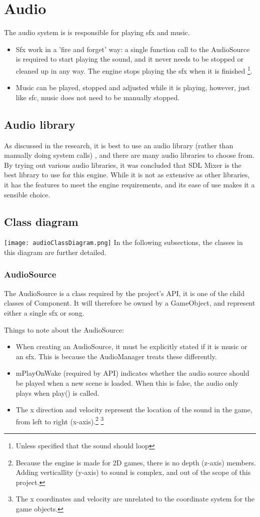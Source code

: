 \section{Audio}
\label{sec:audio}
The audio system is is responsible for playing sfx and music.
\begin{itemize}
    \item Sfx work in a 'fire and forget' way: a single function call to the AudioSource is required to start playing the sound, and it never needs to be stopped or cleaned up in any way. The engine stops playing the sfx when it is finished \footnote{Unless specified that the sound should loop}.
    \item Music can be played, stopped and adjusted while it is playing, however, just like sfc, music does not need to be manually stopped.
\end{itemize}

\subsection{Audio library}
As discussed in the research, it is best to use an audio library (rather than manually doing system calls)
, and there are many audio libraries to choose from. By trying out various audio libraries, it was concluded that
SDL Mixer is the best library to use for this engine. While it is not as extensive as other libraries,
it has the features to meet the engine requirements, and its ease of use makes it a sensible choice.

\subsection{Class diagram}
\texttt{[image: audioClassDiagram.png]}
In the following subsections, the classes in this diagram are further detailed.
\subsubsection{AudioSource}
The AudioSource is a class required by the project's API, it is one of the child classes of Component.
It will therefore be owned by a GameObject, and represent either a single sfx or song.

Things to note about the AudioSource:
\begin{itemize}
    \item When creating an AudioSource, it must be explicitly stated if it is music or an sfx. This is because the AudioManager treats these differently.
    \item mPlayOnWake (required by API) indicates whether the audio source should be played when a new scene is loaded. When this is false, the audio only plays when play() is called.
    \item The x direction and velocity represent the location of the sound in the game, from left to right (x-axis).\footnote{Because the engine is made for 2D games, there is no depth (z-axis) members. Adding verticallity (y-axis) to sound is complex, and out of the scope of this project.} \footnote{The x coordinates and velocity are unrelated to the coordinate system for the game objects.}
\end{itemize}

